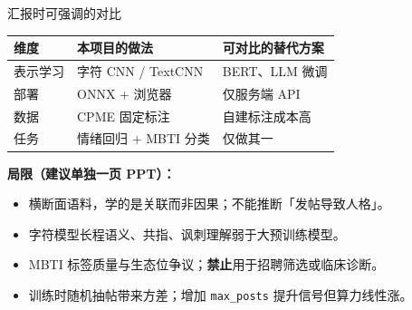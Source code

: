 \begin{frame}{汇报时可强调的对比}
    \small
    \begin{table}
        \centering
        \begin{tabular}{p{3.5cm}p{4.5cm}p{4.5cm}}
            \toprule
            维度 & 本项目的做法 & 可对比的替代方案 \\
            \midrule
            表示学习 & 字符 CNN / TextCNN & BERT、LLM 微调 \\
            部署 & ONNX + 浏览器 & 仅服务端 API \\
            数据 & CPME 固定标注 & 自建标注成本高 \\
            任务 & 情绪回归 + MBTI 分类 & 仅做其一 \\
            \bottomrule
        \end{tabular}
    \end{table}

    \vspace{0.5em}
    \textbf{局限（建议单独一页 PPT）：}
    \begin{itemize}
        \item 横断面语料，学的是关联而非因果；不能推断「发帖导致人格」。
        \item 字符模型长程语义、共指、讽刺理解弱于大预训练模型。
        \item MBTI 标签质量与生态位争议；\textbf{禁止}用于招聘筛选或临床诊断。
        \item 训练时随机抽帖带来方差；增加 \texttt{max\_posts} 提升信号但算力线性涨。
    \end{itemize}
\end{frame}
